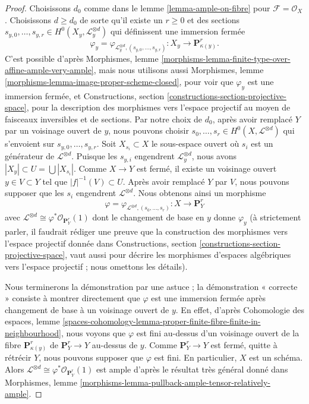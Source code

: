 \begin{proof}
Choisissons $d_0$ comme dans le lemme \ref{lemma-ample-on-fibre} pour
$\mathcal{F} = \mathcal{O}_X$. Choisissons $d \geq d_0$
de sorte qu'il existe un $r \geq 0$ et des sections
$s_{y, 0}, \ldots, s_{y, r} \in H^0(X_y, \mathcal{L}_y^{\otimes d})$
qui définissent une immersion fermée
$$
\varphi_y =
\varphi_{\mathcal{L}_y^{\otimes d}, (s_{y, 0}, \ldots, s_{y, r})} :
X_y \to \mathbf{P}^r_{\kappa(y)}.
$$
C'est possible d'après Morphismes, lemme
\ref{morphisms-lemma-finite-type-over-affine-ample-very-ample},
mais nous utilisons aussi
Morphismes, lemme \ref{morphisms-lemma-image-proper-scheme-closed},
pour voir que $\varphi_y$ est une immersion fermée, et
Constructions, section \ref{constructions-section-projective-space},
pour la description des morphismes vers l'espace projectif
au moyen de faisceaux inversibles et de sections.
Par notre choix de $d_0$, après avoir remplacé $Y$ par un voisinage ouvert
de $y$, nous pouvons choisir
$s_0, \ldots, s_r \in H^0(X, \mathcal{L}^{\otimes d})$
qui s'envoient sur $s_{y, 0}, \ldots, s_{y, r}$.
Soit $X_{s_i} \subset X$ le sous-espace ouvert où $s_i$
est un générateur de $\mathcal{L}^{\otimes d}$. Puisque
les $s_{y, i}$ engendrent $\mathcal{L}_y^{\otimes d}$, nous avons
$|X_y| \subset U = \bigcup |X_{s_i}|$. Comme $X \to Y$ est fermé,
il existe un voisinage ouvert $y \in V \subset Y$
tel que $|f|^{-1}(V) \subset U$. Après avoir remplacé $Y$ par $V$, nous pouvons
supposer que les $s_i$ engendrent $\mathcal{L}^{\otimes d}$. Nous
obtenons ainsi un morphisme
$$
\varphi = \varphi_{\mathcal{L}^{\otimes d}, (s_0, \ldots, s_r)} :
X \longrightarrow \mathbf{P}^r_Y
$$
avec $\mathcal{L}^{\otimes d} \cong \varphi^*\mathcal{O}_{\mathbf{P}^r_Y}(1)$
dont le changement de base en $y$ donne $\varphi_y$ (à strictement parler, il faudrait
rédiger une preuve que la construction des morphismes vers l'espace projectif
donnée dans
Constructions, section \ref{constructions-section-projective-space},
vaut aussi pour décrire les morphismes d'espaces algébriques vers l'espace
projectif ; nous omettons les détails).

\medskip\noindent
Nous terminerons la démonstration par une astuce ; la démonstration « correcte »
consiste à montrer directement que $\varphi$ est une immersion
fermée après changement de base à un voisinage ouvert de $y$.
En effet, d'après
Cohomologie des espaces, lemme
\ref{spaces-cohomology-lemma-proper-finite-fibre-finite-in-neighbourhood},
nous voyons que $\varphi$ est fini au-dessus d'un voisinage ouvert
de la fibre $\mathbf{P}^r_{\kappa(y)}$ de $\mathbf{P}^r_Y \to Y$
au-dessus de $y$. Comme $\mathbf{P}^r_Y \to Y$ est fermé, quitte à
rétrécir $Y$, nous pouvons supposer que $\varphi$ est fini.
En particulier, $X$ est un schéma.
Alors $\mathcal{L}^{\otimes d} \cong \varphi^*\mathcal{O}_{\mathbf{P}^r_Y}(1)$
est ample d'après le résultat très général donné dans
Morphismes, lemme \ref{morphisms-lemma-pullback-ample-tensor-relatively-ample}.
\end{proof}








